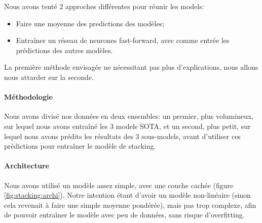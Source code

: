 \documentclass[11pt,a4paper, french]{article}
\begin{document}
Nous avons tenté 2 approches différentes pour réunir les models:

\begin{itemize}
  \item Faire une moyenne des predictions des modèles;
  \item Entraîner un réseau de neurones fast-forward, avec comme entrée les prédictions des autres modèles.
\end{itemize}

La première méthode envisagée ne nécessitant pas plus d'explications, nous allons nous attarder sur la seconde.

\paragraph{Méthodologie} Nous avons divisé nos données en deux ensembles: un premier, plus volumineux, sur lequel nous avons entraîné les 3 models SOTA, et un second, plus petit, sur lequel nous avons prédits les résultats des 3 sous-models, avant d'utiliser ces prédictions pour entraîner le modèle de stacking.

\paragraph{Architecture} Nous avons utilisé un modèle assez simple, avec une couche cachée (figure \ref{fig:stacking:archi}). Notre intention étant d'avoir un modèle non-linéaire (sinon cela revenait à faire une simple moyenne pondérée), mais pas trop complexe, afin de pouvoir entraîner le modèle avec peu de données, sans risque d'overfitting.
\end{document}
